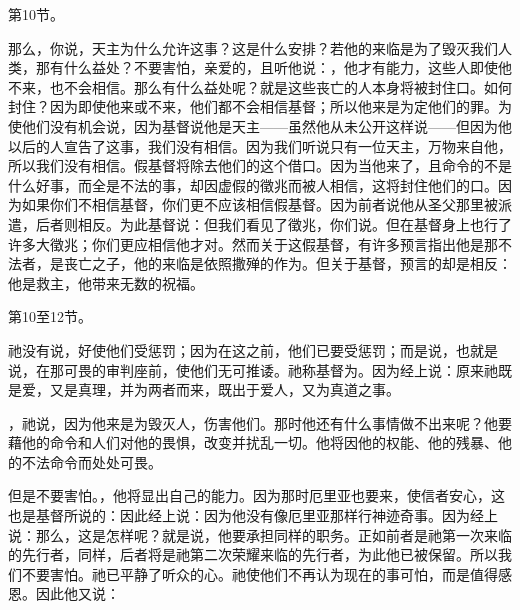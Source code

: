 第10节。\par

那么，你说，天主为什么允许这事？这是什么安排？若他的来临是为了毁灭我们人类，那有什么益处？不要害怕，亲爱的，且听他说：，他才有能力，这些人即使他不来，也不会相信。那么有什么益处呢？就是这些丧亡的人本身将被封住口。如何封住？因为即使他来或不来，他们都不会相信基督；所以他来是为定他们的罪。为使他们没有机会说，因为基督说他是天主——虽然他从未公开这样说——但因为他以后的人宣告了这事，我们没有相信。因为我们听说只有一位天主，万物来自他，所以我们没有相信。假基督将除去他们的这个借口。因为当他来了，且命令的不是什么好事，而全是不法的事，却因虚假的徵兆而被人相信，这将封住他们的口。因为如果你们不相信基督，你们更不应该相信假基督。因为前者说他从圣父那里被派遣，后者则相反。为此基督说：但我们看见了徵兆，你们说。但在基督身上也行了许多大徵兆；你们更应相信他才对。然而关于这假基督，有许多预言指出他是那不法者，是丧亡之子，他的来临是依照撒殚的作为。但关于基督，预言的却是相反：他是救主，他带来无数的祝福。\par

第10至12节。\par

祂没有说，好使他们受惩罚；因为在这之前，他们已要受惩罚；而是说，也就是说，在那可畏的审判座前，使他们无可推诿。祂称基督为。因为经上说：原来祂既是爱，又是真理，并为两者而来，既出于爱人，又为真道之事。\par

，祂说，因为他来是为毁灭人，伤害他们。那时他还有什么事情做不出来呢？他要藉他的命令和人们对他的畏惧，改变并扰乱一切。他将因他的权能、他的残暴、他的不法命令而处处可畏。\par

但是不要害怕。，他将显出自己的能力。因为那时厄里亚也要来，使信者安心，这也是基督所说的：因此经上说：因为他没有像厄里亚那样行神迹奇事。因为经上说：那么，这是怎样呢？就是说，他要承担同样的职务。正如前者是祂第一次来临的先行者，同样，后者将是祂第二次荣耀来临的先行者，为此他已被保留。所以我们不要害怕。祂已平静了听众的心。祂使他们不再认为现在的事可怕，而是值得感恩。因此他又说：\par

